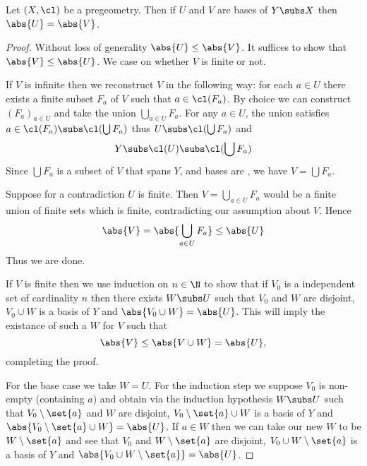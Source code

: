 \begin{prop}
    Let $(X,\cl)$ be a pregeometry.
    Then if $U$ and $V$ are bases of $Y \subs X$ then $\abs{U} = \abs{V}$.
\end{prop}
\begin{proof}
    Without loss of generality $\abs{U} \leq \abs{V}$.
    It suffices to show that $\abs{V} \leq \abs{U}$.
    We case on whether $V$ is finite or not.

    If $V$ is infinite then we reconstruct $V$ in the following way:
    for each $a \in U$ there exists a finite subset $F_a$ of $V$ such that 
    $a \in \cl(F_a)$.
    By choice we can construct $(F_a)_{a \in U}$ and take the union 
    $\bigcup_{a \in U} F_a$.
    For any $a \in U$, the union satisfies 
    $a \in \cl(F_a) \subs \cl(\bigcup F_a)$
    thus $U \subs \cl(\bigcup F_a)$ and
    \[Y \subs \cl(U) \subs \cl(\bigcup F_a)\]
    Since $\bigcup F_a$ is a subset of $V$ that spans $Y$, 
    and bases are , 
    we have $V = \bigcup F_a$.

    Suppose for a contradiction $U$ is finite. 
    Then $V = \bigcup_{a \in U} F_a$ would be a finite union of finite sets 
    which is finite,
    contradicting our assumption about $V$.
    Hence 
    \[
        \abs{V}  = \abs{\bigcup_{a \in U} F_a} 
        \leq \abs{U}
    \]
    Thus we are done.

    If $V$ is finite then we use induction on $n \in \N$ to show that 
    if $V_0$ is a independent set of cardinality $n$ then there exists 
    $W \subs U$ such that $V_0$ and $W$ are disjoint, 
    $V_0 \cup W$ is a basis of $Y$ 
    and $\abs{V_0 \cup W} = \abs{U}$.
    This will imply the existance of such a $W$ for $V$ such that 
    \[\abs{V} \leq \abs{V \cup W} = \abs{U},\]
    completing the proof.

    For the base case we take $W = U$.
    For the induction step we suppose $V_0$ is non-empty (containing $a$) and 
    obtain via the induction hypothesis 
    $W \subs U$ such that $V_0 \setminus \set{a}$ and $W$ are disjoint, 
    $V_0 \setminus \set{a} \cup W$ is a basis of $Y$ 
    and $\abs{V_0 \setminus \set{a} \cup W} = \abs{U}$.
    If $a \in W$ then we can take our new $W$ to be $W \setminus \set{a}$
    and see that $V_0$ and $W \setminus \set{a}$ are disjoint, 
    $V_0 \cup W \setminus \set{a}$ is a basis of $Y$ 
    and $\abs{V_0 \cup W \setminus \set{a}} = \abs{U}$.
    

\end{proof}
